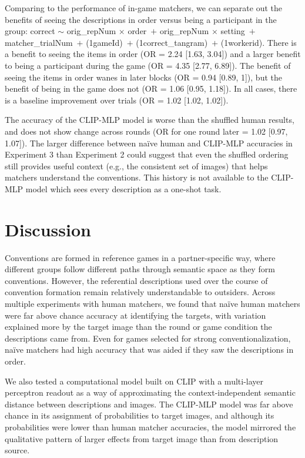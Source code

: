 \documentclass[10pt, letterpaper]{article}
\begin{document}
Comparing to the performance of in-game matchers, we can separate out
the benefits of seeing the descriptions in order versus being a
participant in the group: correct \({\sim}\) orig\_repNum \({\times}\)
order~\({+}\) orig\_repNum \({\times}\) setting~\({+}\)
matcher\_trialNum~\({+}\) (1\textbar gameId)~\({+}\)
(1\textbar correct\_tangram)~\({+}\) (1\textbar workerid). There is a
benefit to seeing the items in order (OR = 2.24 {[}1.63, 3.04{]}) and a
larger benefit to being a participant during the game (OR = 4.35
{[}2.77, 6.89{]}). The benefit of seeing the items in order wanes in
later blocks (OR = 0.94 {[}0.89, 1{]}), but the benefit of being in the
game does not (OR = 1.06 {[}0.95, 1.18{]}). In all cases, there is a
baseline improvement over trials (OR = 1.02 {[}1.02, 1.02{]}).

The accuracy of the CLIP-MLP model is worse than the shuffled human
results, and does not show change across rounds (OR for one round later
= 1.02 {[}0.97, 1.07{]}). The larger difference between naïve human and
CLIP-MLP accuracies in Experiment 3 than Experiment 2 could suggest that
even the shuffled ordering still provides useful context (e.g., the
consistent set of images) that helps matchers understand the
conventions. This history is not available to the CLIP-MLP model which
sees every description as a one-shot task.

\section{Discussion}\label{discussion}

Conventions are formed in reference games in a partner-specific way,
where different groups follow different paths through semantic space as
they form conventions. However, the referential descriptions used over
the course of convention formation remain relatively understandable to
outsiders. Across multiple experiments with human matchers, we found
that naïve human matchers were far above chance accuracy at identifying
the targets, with variation explained more by the target image than the
round or game condition the descriptions came from. Even for games
selected for strong conventionalization, naïve matchers had high
accuracy that was aided if they saw the descriptions in order.

We also tested a computational model built on CLIP with a multi-layer
perceptron readout as a way of approximating the context-independent
semantic distance between descriptions and images. The CLIP-MLP model
was far above chance in its assignment of probabilities to target
images, and although its probabilities were lower than human matcher
accuracies, the model mirrored the qualitative pattern of larger effects
from target image than from description source.
\end{document}
